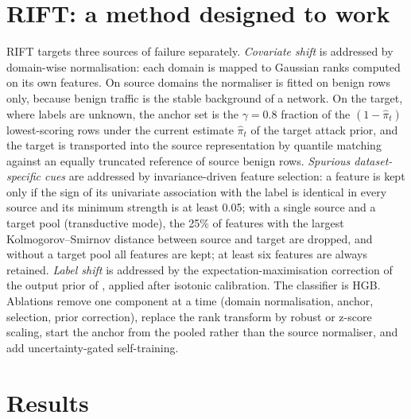 \documentclass[11pt]{article}
\begin{document}
\section{RIFT: a method designed to work}
RIFT targets three sources of failure separately.
\emph{Covariate shift} is addressed by domain-wise normalisation: each domain is mapped to Gaussian ranks computed on its own features.
On source domains the normaliser is fitted on benign rows only, because benign traffic is the stable background of a network.
On the target, where labels are unknown, the anchor set is the $\gamma=0.8$ fraction of the $(1-\hat\pi_t)$ lowest-scoring rows under the current estimate $\hat\pi_t$ of the target attack prior, and the target is transported into the source representation by quantile matching against an equally truncated reference of source benign rows.
\emph{Spurious dataset-specific cues} are addressed by invariance-driven feature selection: a feature is kept only if the sign of its univariate association with the label is identical in every source and its minimum strength is at least 0.05; with a single source and a target pool (transductive mode), the 25\% of features with the largest Kolmogorov--Smirnov distance between source and target are dropped, and without a target pool all features are kept; at least six features are always retained.
\emph{Label shift} is addressed by the expectation-maximisation correction of the output prior of \citet{saerens2002adjusting}, applied after isotonic calibration.
The classifier is HGB.
Ablations remove one component at a time (domain normalisation, anchor, selection, prior correction), replace the rank transform by robust or z-score scaling, start the anchor from the pooled rather than the source normaliser, and add uncertainty-gated self-training.

\section{Results}
\end{document}
